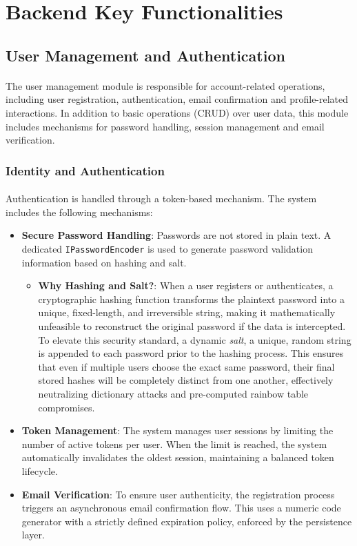 \section{Backend Key Functionalities}

\subsection{User Management and Authentication}
\paragraph{}The user management module is responsible for account-related operations, including user registration, authentication, email confirmation and profile-related interactions. In addition to basic operations (CRUD) over user data, this module includes mechanisms for password handling, session management and email verification.

\subsubsection{Identity and Authentication}
\paragraph{}Authentication is handled through a token-based mechanism. The system includes the following mechanisms:
\begin{itemize}
    \item \textbf{Secure Password Handling}: Passwords are not stored in plain text. A dedicated \texttt{IPasswordEncoder} is used to generate password validation information based on hashing and salt.
    \begin{itemize}
        \item \textbf{Why Hashing and Salt?}: When a user registers or authenticates, a cryptographic hashing function transforms the plaintext password into a unique, fixed-length, and irreversible string, making it mathematically unfeasible to reconstruct the original password if the data is intercepted. To elevate this security standard, a dynamic \textit{salt}, a unique, random string is appended to each password prior to the hashing process. This ensures that even if multiple users choose the exact same password, their final stored hashes will be completely distinct from one another, effectively neutralizing dictionary attacks and pre-computed rainbow table compromises.
    \end{itemize}
    \item \textbf{Token Management}: The system manages user sessions by limiting the number of active tokens per user. When the limit is reached, the system automatically invalidates the oldest session, maintaining a balanced token lifecycle.
    \item \textbf{Email Verification}: To ensure user authenticity, the registration process triggers an asynchronous email confirmation flow. This uses a numeric code generator with a strictly defined expiration policy, enforced by the persistence layer.
\end{itemize}

